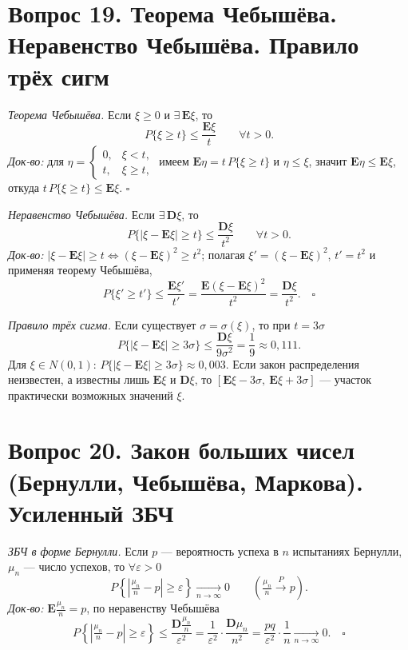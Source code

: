 \section*{Вопрос 19. Теорема Чебышёва. Неравенство Чебышёва. Правило трёх сигм}

\textit{Теорема Чебышёва.} Если $\xi\ge0$ и $\exists\,\mathbf{E}\xi$, то
\[ P\{\xi\ge t\}\le\frac{\mathbf{E}\xi}{t}\qquad\forall t>0. \]
\textit{Док-во:} для $\eta=\begin{cases}0,&\xi<t,\\ t,&\xi\ge t,\end{cases}$ имеем $\mathbf{E}\eta=t\,P\{\xi\ge t\}$ и $\eta\le\xi$, значит $\mathbf{E}\eta\le\mathbf{E}\xi$, откуда $t\,P\{\xi\ge t\}\le\mathbf{E}\xi$. \hfill$\square$

\textit{Неравенство Чебышёва.} Если $\exists\,\mathbf{D}\xi$, то
\[ P\{|\xi-\mathbf{E}\xi|\ge t\}\le\frac{\mathbf{D}\xi}{t^2}\qquad\forall t>0. \]
\textit{Док-во:} $|\xi-\mathbf{E}\xi|\ge t\Leftrightarrow(\xi-\mathbf{E}\xi)^2\ge t^2$; полагая $\xi'=(\xi-\mathbf{E}\xi)^2$, $t'=t^2$ и применяя теорему Чебышёва,
\[ P\{\xi'\ge t'\}\le\frac{\mathbf{E}\xi'}{t'}=\frac{\mathbf{E}(\xi-\mathbf{E}\xi)^2}{t^2}=\frac{\mathbf{D}\xi}{t^2}. \quad\square \]

\textit{Правило трёх сигма.} Если существует $\sigma=\sigma(\xi)$, то при $t=3\sigma$
\[ P\{|\xi-\mathbf{E}\xi|\ge3\sigma\}\le\frac{\mathbf{D}\xi}{9\sigma^2}=\frac{1}{9}\approx0{,}111. \]
Для $\xi\in N(0,1)$: $P\{|\xi-\mathbf{E}\xi|\ge3\sigma\}\approx0{,}003$. Если закон распределения неизвестен, а известны лишь $\mathbf{E}\xi$ и $\mathbf{D}\xi$, то $[\mathbf{E}\xi-3\sigma,\ \mathbf{E}\xi+3\sigma]$ — участок практически возможных значений $\xi$.

\section*{Вопрос 20. Закон больших чисел (Бернулли, Чебышёва, Маркова). Усиленный ЗБЧ}

\textit{ЗБЧ в форме Бернулли.} Если $p$ — вероятность успеха в $n$ испытаниях Бернулли, $\mu_n$ — число успехов, то $\forall\varepsilon>0$
\[ P\!\left\{\left|\tfrac{\mu_n}{n}-p\right|\ge\varepsilon\right\}\xrightarrow[n\to\infty]{}0 \qquad\left(\tfrac{\mu_n}{n}\xrightarrow{P}p\right). \]
\textit{Док-во:} $\mathbf{E}\tfrac{\mu_n}{n}=p$, по неравенству Чебышёва
\[ P\!\left\{\left|\tfrac{\mu_n}{n}-p\right|\ge\varepsilon\right\}\le\frac{\mathbf{D}\tfrac{\mu_n}{n}}{\varepsilon^2}=\frac{1}{\varepsilon^2}\cdot\frac{\mathbf{D}\mu_n}{n^2}=\frac{pq}{\varepsilon^2}\cdot\frac1n\xrightarrow[n\to\infty]{}0. \quad\square \]

